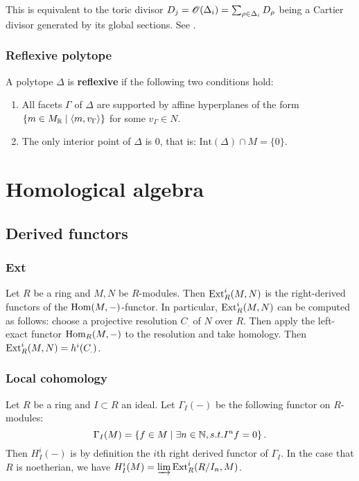 \documentclass[11pt, english]{article}
\begin{document}
This is equivalent to the toric divisor $D_j=\operatorname{\mathscr{O}}(\Delta_i)=\sum_{\rho \in \Delta_i} D_\rho$ being a Cartier divisor generated by its global sections. See \cite[Chapter 4.3]{mirrorsymalggeo}.  

\subsubsection{Reflexive polytope}
\label{reflexivepolytope}

A polytope $\Delta$ is \textbf{reflexive} if the following two conditions hold:
\begin{enumerate}
\item All facets $\Gamma$ of $\Delta$ are supported by affine hyperplanes of the form $\{ m \in M_{\mathbb{R}} \mid \langle m,v_\Gamma \rangle \}$ for some $v_\Gamma \in N$.
\item The only interior point of $\Delta$ is $0$, that is: $\mathrm{Int}(\Delta) \cap M = \{0\}$.
\end{enumerate}

\section{Homological algebra}
\subsection{Derived functors}
\subsubsection{Ext}
\label{ext}
Let $R$ be a ring and $M,N$ be $R$-modules. Then $\operatorname{\mathrm{Ext}}_R^i(M,N)$ is the right-derived functors of the $\operatorname{Hom}(M,-)$-functor. In particular, $\operatorname{\mathrm{Ext}}^i_R(M,N)$ can be computed as follows: choose a projective resolution $C_.$ of $N$ over $R$. Then apply the left-exact functor $\operatorname{Hom}_R(M,-)$ to the resolution and take homology. Then $\operatorname{\mathrm{Ext}}_R^i(M,N)=h^i(C_.)$.

\subsubsection{Local cohomology}
\label{localcohomology}
Let $R$ be a ring and $I \subset R$ an ideal. Let $\Gamma_I(-)$ be the following functor on $R$-modules:
\[
\Gamma_I(M) = \left\{ f \in M \mid \exists n \in \mathbb{N}, s.t. I^n f = 0 \right \}.
\]
Then $H_I^i(-)$ is by definition the $i$th right derived functor of $\Gamma_I$.  In the case that $R$ is noetherian, we have $H_I^i(M) = \varinjlim \operatorname{\mathrm{Ext}}^i_R(R/I_n,M)$.
\end{document}
